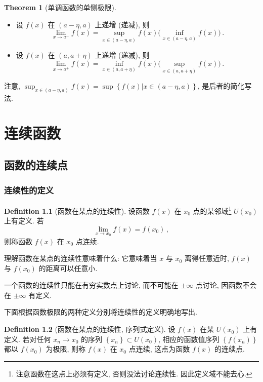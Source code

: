\documentclass{book}
\newcommand{\set}[1]{\left\{#1\right\}}
\renewcommand{\U}[1]{U\!\left( #1 \right)}%
\numberwithin{equation}{section}
\numberwithin{figure}{section}
\theoremstyle{definition}
\newtheorem{definition}{Definition}
\newtheorem{theorem}{Theorem}[section]
\begin{document}
\begin{theorem}[单调函数的单侧极限]
  \leavevmode

  \begin{itemize}
    \item 设 $f(x)$ 在 $(a-\eta,a)$ 上递增 (递减), 则
      \begin{equation*}
	\lim_{x\to a^-}f(x)=\sup_{x\in(a-\eta,a)}f(x) \bigg( \inf_{x\in(a-\eta,a)}f(x) \bigg)\,.
      \end{equation*}
    \item 设 $f(x)$ 在 $(a,a+\eta)$ 上递增 (递减), 则
      \begin{equation*}
	\lim_{x\to a^+}f(x)=\inf_{x\in(a,a+\eta)}f(x) \bigg( \sup_{x\in(a,a+\eta)}f(x) \bigg)\,.
      \end{equation*}
  \end{itemize}
\end{theorem}
注意, $\sup_{x\in(a-\eta,a)}f(x)=\sup\set{f(x)|x\in(a-\eta,a)}$, 是后者的简化写法.

\chapter{连续函数}
\section{函数的连续点}
\subsection{连续性的定义}
\begin{definition}[函数在某点的连续性]
  设函数 $f(x)$ 在 $x_0$ 点的某邻域\footnote{注意函数在这点上必须有定义, 否则没法讨论连续性. 因此定义域不能去心.} $\U{x_0}$ 上有定义. 若
  \begin{equation*}
    \lim_{x\to x_0}f(x)=f(x_0)\,,
  \end{equation*}
  则称函数 $f(x)$ 在 $x_0$ 点连续.
\end{definition}

理解函数在某点的连续性意味着什么: 它意味着当 $x$ 与 $x_0$ 离得任意近时, $f(x)$ 与 $f(x_0)$ 的距离可以任意小.

一个函数的连续性只能在有穷实数点上讨论, 而不可能在 $\pm\infty$ 点讨论, 因函数不会在 $\pm\infty$ 有定义.

下面根据函数极限的两种定义分别将连续性的定义明确地写出.
\begin{definition}[函数在某点的连续性, 序列式定义]
  设 $f(x)$ 在某 $\U{x_0}$ 上有定义. 若对任何 $x_n\to x_0$ 的序列 $\set{x_n}\subset \U{x_0}$, 相应的函数值序列 $\set{f(x_n)}$ 都以 $f(x_0)$ 为极限, 则称 $f(x)$ 在 $x_0$ 点连续, 这点为函数 $f(x)$ 的连续点.
\end{definition}
\end{document}
